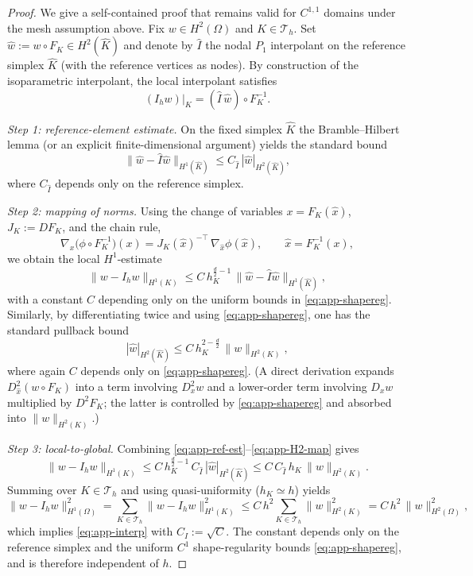 \documentclass[11pt,a4paper]{article}
\numberwithin{equation}{section}
\theoremstyle{definition}
\newcommand{\1}{\mathbbm{1}}
\begin{document}
\begin{proof}
We give a self-contained proof that remains valid for $C^{1,1}$ domains under the mesh assumption above.
Fix $w\in H^2(\Omega)$ and $K\in\mathcal T_h$.
Set $\widehat w:=w\circ F_K\in H^2(\widehat K)$ and denote by $\widehat I$ the nodal $P_1$ interpolant on the reference simplex
$\widehat K$ (with the reference vertices as nodes).
By construction of the isoparametric interpolant, the local interpolant satisfies
\begin{equation}
\label{eq:app-local-interp}
(I_hw)|_{K} = (\widehat I\,\widehat w)\circ F_K^{-1}.
\end{equation}

\smallskip
\noindent\emph{Step 1: reference-element estimate.}
On the fixed simplex $\widehat K$ the Bramble--Hilbert lemma (or an explicit finite-dimensional argument) yields the standard bound
\begin{equation}
\label{eq:app-ref-est}
\|\widehat w-\widehat I\widehat w\|_{H^1(\widehat K)}\le C_{\widehat I}\,|\widehat w|_{H^2(\widehat K)},
\end{equation}
where $C_{\widehat I}$ depends only on the reference simplex.

\smallskip
\noindent\emph{Step 2: mapping of norms.}
Using the change of variables $x=F_K(\widehat x)$, $J_K:=DF_K$, and the chain rule,
\[\nabla_x \big(\phi\circ F_K^{-1}\big)(x)=J_K(\widehat x)^{-\top}\,\nabla_{\widehat x}\phi(\widehat x),\qquad \widehat x=F_K^{-1}(x),\]
we obtain the local $H^1$-estimate
\begin{equation}
\label{eq:app-H1-map}
\|w-I_hw\|_{H^1(K)}\le C\,h_K^{\frac d2-1}\,\|\widehat w-\widehat I\widehat w\|_{H^1(\widehat K)},
\end{equation}
with a constant $C$ depending only on the uniform bounds in \eqref{eq:app-shapereg}.
Similarly, by differentiating twice and using \eqref{eq:app-shapereg}, one has the standard pullback bound
\begin{equation}
\label{eq:app-H2-map}
|\widehat w|_{H^2(\widehat K)}\le C\,h_K^{2-\frac d2}\,\|w\|_{H^2(K)},
\end{equation}
where again $C$ depends only on \eqref{eq:app-shapereg}.
(A direct derivation expands $D^2_{\widehat x}(w\circ F_K)$ into a term involving $D^2_x w$ and a lower-order term involving
$D_x w$ multiplied by $D^2F_K$; the latter is controlled by \eqref{eq:app-shapereg} and absorbed into $\|w\|_{H^2(K)}$.)

\smallskip
\noindent\emph{Step 3: local-to-global.}
Combining \eqref{eq:app-ref-est}--\eqref{eq:app-H2-map} gives
\[
\|w-I_hw\|_{H^1(K)}
\le C\,h_K^{\frac d2-1}\,C_{\widehat I}\,|\widehat w|_{H^2(\widehat K)}
\le C\,C_{\widehat I}\,h_K\,\|w\|_{H^2(K)}.
\]
Summing over $K\in\mathcal T_h$ and using quasi-uniformity ($h_K\simeq h$) yields
\[
\|w-I_hw\|_{H^1(\Omega)}^2
=\sum_{K\in\mathcal T_h}\|w-I_hw\|_{H^1(K)}^2
\le C\,h^2\sum_{K\in\mathcal T_h}\|w\|_{H^2(K)}^2
=C\,h^2\,\|w\|_{H^2(\Omega)}^2,
\]
which implies \eqref{eq:app-interp} with $C_I:=\sqrt{C}$.
The constant depends only on the reference simplex and the uniform $C^1$ shape-regularity bounds \eqref{eq:app-shapereg},
and is therefore independent of $h$.
\end{proof}
\end{document}
